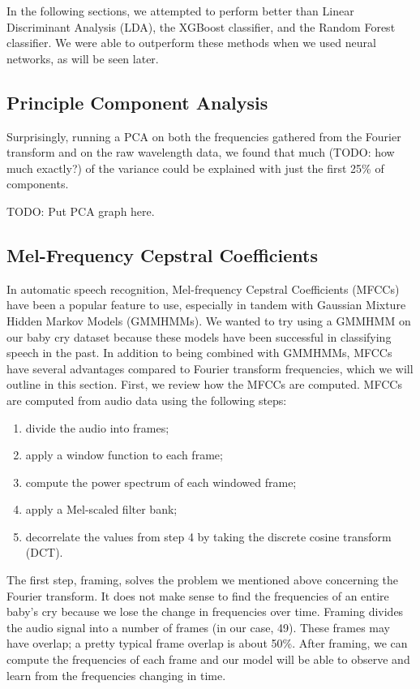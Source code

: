 \documentclass[11pt]{article}
\begin{document}
In the following sections, we attempted to perform better than Linear Discriminant Analysis (LDA), the XGBoost classifier, and the Random Forest classifier.
We were able to outperform these methods when we used neural networks, as will be seen later.

\subsection{Principle Component Analysis}
Surprisingly, running a PCA on both the frequencies gathered from the Fourier transform and on the raw wavelength data, we found that much (TODO: how much exactly?) of the variance could be explained with just the first 25\% of components.

TODO: Put PCA graph here.

\subsection{Mel-Frequency Cepstral Coefficients}
In automatic speech recognition, Mel-frequency Cepstral Coefficients (MFCCs) have been a popular feature to use, especially in tandem with Gaussian Mixture Hidden Markov Models (GMMHMMs).
We wanted to try using a GMMHMM on our baby cry dataset because these models have been successful in classifying speech in the past.
In addition to being combined with GMMHMMs, MFCCs have several advantages compared to Fourier transform frequencies, which we will outline in this section.
First, we review how the MFCCs are computed.
MFCCs are computed from audio data using the following steps:
\begin{enumerate}
   \item divide the audio into frames;
   \item apply a window function to each frame;
   \item compute the power spectrum of each windowed frame;
   \item apply a Mel-scaled filter bank;
   \item decorrelate the values from step 4 by taking the discrete cosine transform (DCT).
\end{enumerate}

The first step, framing, solves the problem we mentioned above concerning the Fourier transform.
It does not make sense to find the frequencies of an entire baby's cry because we lose the change in frequencies over time.
Framing divides the audio signal into a number of frames (in our case, 49).
These frames may have overlap; a pretty typical frame overlap is about 50\%.
After framing, we can compute the frequencies of each frame and our model will be able to observe and learn from the frequencies changing in time.
\end{document}
